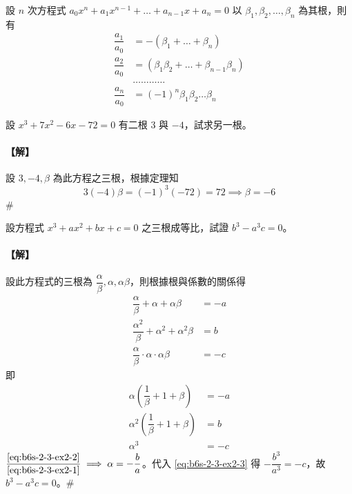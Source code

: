\begin{theorem}\label{thm:b6s-2-vieta}
設 $n$ 次方程式 $a_0 x^n + a_1 x^{n-1} + \dots + a_{n-1} x + a_n = 0$ 以 $\beta_1, \beta_2, \dots, \beta_n$ 為其根，則有
\begin{equation}
\begin{aligned}
\dfrac{a_1}{a_0} &= -(\beta_1+\dots+\beta_n) \\
\dfrac{a_2}{a_0} &= (\beta_1\beta_2+\dots+\beta_{n-1}\beta_n) \\
&\dots\dots\dots\dots \\
\dfrac{a_n}{a_0} &= (-1)^n \beta_1\beta_2\dots\beta_n
\end{aligned} \tag{II} \label{eq:b6s-2-3-II}
\end{equation}
\end{theorem}

\begin{example}\label{ex:b6s-2-8}
設 $x^3+7x^2-6x-72=0$ 有二根 3 與 $-4$，試求另一根。
\end{example}

\paragraph{【解】}
設 $3, -4, \beta$ 為此方程之三根，根據定理知
\[ 3(-4)\beta = (-1)^3(-72) = 72 \implies \beta = -6 \]\hfill$\#$

\begin{example}\label{ex:b6s-2-9}
設方程式 $x^3+ax^2+bx+c=0$ 之三根成等比，試證 $b^3-a^3c=0$。
\end{example}

\paragraph{【解】}
設此方程式的三根為 $\dfrac{\alpha}{\beta}, \alpha, \alpha\beta$，則根據根與係數的關係得
\begin{align*}
\dfrac{\alpha}{\beta} + \alpha + \alpha\beta &= -a \\
\dfrac{\alpha^2}{\beta} + \alpha^2 + \alpha^2\beta &= b \\
\dfrac{\alpha}{\beta} \cdot \alpha \cdot \alpha\beta &= -c
\end{align*}
即
\begin{align}
\alpha\left(\dfrac{1}{\beta}+1+\beta\right) &= -a \label{eq:b6s-2-3-ex2-1} \\
\alpha^2\left(\dfrac{1}{\beta}+1+\beta\right) &= b \label{eq:b6s-2-3-ex2-2} \\
\alpha^3 &= -c \label{eq:b6s-2-3-ex2-3}
\end{align}
$\dfrac{\eqref{eq:b6s-2-3-ex2-2}}{\eqref{eq:b6s-2-3-ex2-1}} \implies \alpha = -\dfrac{b}{a}$。代入 \eqref{eq:b6s-2-3-ex2-3} 得 $-\dfrac{b^3}{a^3} = -c$，故 $b^3 - a^3 c = 0$。\hfill$\#$

